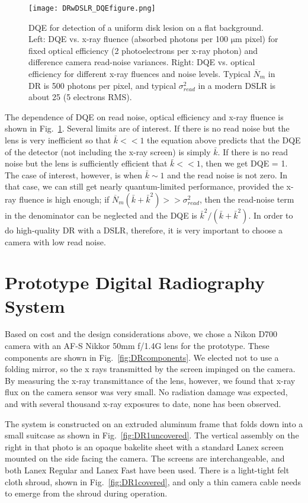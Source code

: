 \begin{figure}
\centering
\texttt{[image: DRwDSLR\_DQEfigure.png]}
\caption{DQE for detection of a uniform disk lesion on a flat background. Left: DQE vs. x-ray fluence (absorbed photons per 100 $\mathrm{\mu m}$ pixel) for fixed optical efficiency (2 photoelectrons per x-ray photon) and difference camera read-noise variances. Right: DQE vs. optical efficiency for different x-ray fluences and noise levels. Typical $\overline{N}_m$ in DR is 500 photons per pixel, and typical $\sigma_{read}^2$ in a modern DSLR is about 25 (5 electrons RMS).}
\label{fig:DQE}
\end{figure}

The dependence of DQE on read noise, optical efficiency and x-ray fluence is shown in Fig.~\ref{fig:DQE}. Several limits are of interest. If there is no read noise but the lens is very inefficient so that $\bar{k} << 1$ the equation above predicts that the DQE of the detector (not including the x-ray screen) is simply $\bar{k}$.  If there is no read noise but the lens is sufficiently efficient that $\bar{k} << 1$, then we get DQE = 1. The case of interest, however, is when $\bar{k} \sim 1$ and the read noise is not zero. In that case, we can still get nearly quantum-limited performance, provided the x-ray fluence is high enough; if $\overline{N}_m(\bar{k}+\bar{k}^2) >> \sigma_{read}^2$, then the read-noise term in the denominator can be neglected and the DQE is $\bar{k}^2/(\bar{k}+\bar{k}^2)$. In order to do high-quality DR with a DSLR, therefore, it is very important to choose a camera with low read noise.

\section{Prototype Digital Radiography System}
Based on cost and the design considerations above, we chose a Nikon D700 camera with an AF-S Nikkor 50mm f/1.4G lens for the prototype.  These components are shown in Fig.~\ref{fig:DRcomponents}. We elected not to use a folding mirror, so the x rays transmitted by the screen impinged on the camera. By measuring the x-ray transmittance of the lens, however, we found that x-ray flux on the camera sensor was very small. No radiation damage was expected, and with several thousand x-ray exposures to date, none has been observed.

The system is constructed on an extruded aluminum frame that folds down into a small suitcase as shown in Fig.~\ref{fig:DR1uncovered}. The vertical assembly on the right in that photo is an opaque bakelite sheet with a standard Lanex screen mounted on the side facing the camera. The screens are interchangeable, and both Lanex Regular and Lanex Fast have been used. There is a light-tight felt cloth shroud, shown in Fig.~\ref{fig:DR1covered}, and only a thin camera cable needs to emerge from the shroud during operation.

